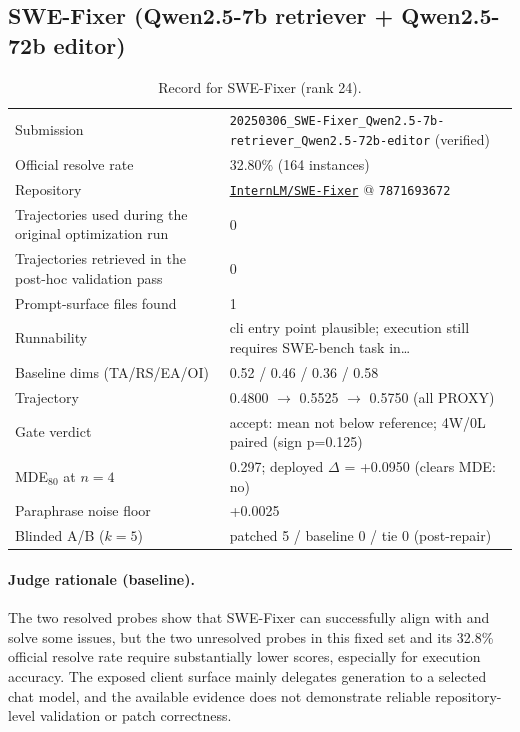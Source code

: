 \subsection{SWE-Fixer (Qwen2.5-7b retriever + Qwen2.5-72b editor)}
\label{app:agent24}
\begin{table}[H]\centering\scriptsize
\caption{Record for SWE-Fixer (rank 24).}
\begin{tabular}{lp{8.2cm}}\toprule
Submission & \texttt{20250306\_\allowbreak{}SWE-Fixer\_\allowbreak{}Qwen2.5-7b-retriever\_\allowbreak{}Qwen2.5-72b-editor} (verified) \\
Official resolve rate & 32.80\% (164 instances) \\
Repository & \href{https://github.com/InternLM/SWE-Fixer}{\texttt{InternLM/SWE-Fixer}} @ \texttt{7871693672} \\
Trajectories used during the original optimization run & 0 \\
Trajectories retrieved in the post-hoc validation pass & 0 \\
Prompt-surface files found & 1 \\
Runnability & cli entry point plausible; execution still requires SWE-bench task in\ldots{} \\
Baseline dims (TA/RS/EA/OI) & 0.52 / 0.46 / 0.36 / 0.58 \\
Trajectory & 0.4800 $\to$ 0.5525 $\to$ 0.5750 (all PROXY) \\
Gate verdict & accept: mean not below reference; 4W/0L paired (sign p=0.125) \\
MDE$_{80}$ at $n{=}4$ & 0.297; deployed $\Delta$ = +0.0950 (clears MDE: no) \\
Paraphrase noise floor & +0.0025 \\
Blinded A/B ($k{=}5$) & patched 5 / baseline 0 / tie 0 (post-repair) \\
\bottomrule\end{tabular}\end{table}
\paragraph{Judge rationale (baseline).}
The two resolved probes show that SWE-Fixer can successfully align with and solve some issues, but the two unresolved probes in this fixed set and its 32.8\% official resolve rate require substantially lower scores, especially for execution accuracy. The exposed client surface mainly delegates generation to a selected chat model, and the available evidence does not demonstrate reliable repository-level validation or patch correctness.
